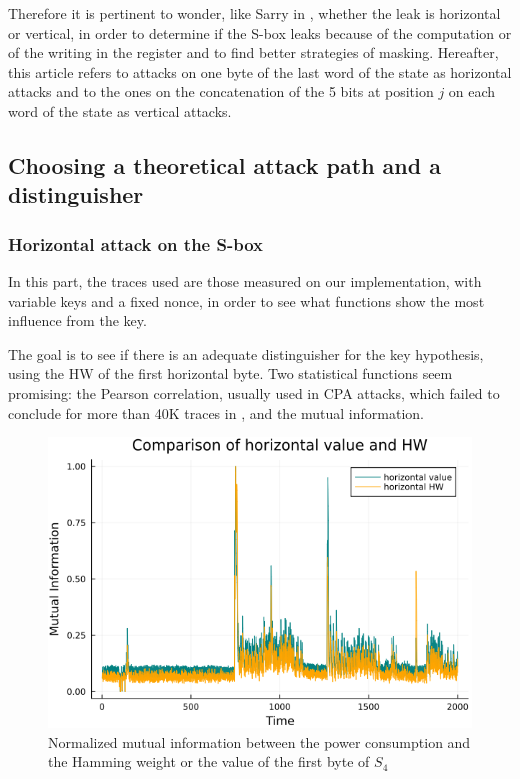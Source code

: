 \documentclass[11pt,technote]{IEEEtran}
\begin{document}
		Therefore it is pertinent to wonder, like Sarry in \cite{these}, whether the leak is horizontal or vertical, in order to determine if the S-box leaks because of the computation or of the writing in the register and to find better strategies of masking. Hereafter, this article refers to attacks on one byte of the last word of the state as horizontal attacks and to the ones on the concatenation of the 5 bits at position $j$ on each word of the state as vertical attacks.
		
		\subsection{Choosing a theoretical attack path and a distinguisher} \label{choice}
		\subsubsection{Horizontal attack on the S-box}
		In this part, the traces used are those measured on our implementation, with variable keys and a fixed nonce, in order to see what functions show the most influence from the key.
		
		The goal is to see if there is an adequate distinguisher for the key hypothesis, using the HW of the first horizontal byte. Two statistical functions seem promising: the Pearson correlation, usually used in CPA attacks, which failed to conclude for more than 40K traces in \cite{dl_cpa}, and the mutual information.
		
		\begin{figure}[h]
		\centering
		\includegraphics[scale=0.4]{img_files/horizontal_one_byte}
		\caption{Normalized mutual information between the power consumption and the Hamming weight or the value of the first byte of $S_4$}
		\label{hHW&val}
		\end{figure}
		
\end{document}
